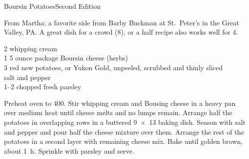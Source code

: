 \begin{entry}{Boursin Potatoes}{Second Edition}

\begin{open}
    From Martha: a favorite side from Barby Buckman at St.~Peter's in the Great
    Valley, PA. A great dish for a crowd (8), or a half recipe also works well
    for 4.
\end{open}
\begin{ingredients}
    \SI{2}{\cup} whipping cream\\
    1 \SI{5}{\ounce} ounce package Boursin cheese (herbs)\\
    \SI{3}{\pound} red new potatoes, or Yukon Gold, unpeeled, scrubbed and
    thinly sliced\\
    salt and pepper\\
    \SIrange{1}{2}{\tblspoon} chopped fresh parsley
\end{ingredients}
Preheat oven to \SI{400}{\degreeF}. Stir whipping cream and Bousing cheese in a
heavy pan over medium heat until cheese melts and no lumps remain. Arrange half
the potatoes in overlapping rows in a buttered \SI{9x13}{\inch} baking dish.
Season with salt and pepper and pour half the cheese mixture over them. Arrange
the rest of the potatoes in a second layer with remaining cheese mix. Bake until
golden brown, about \SI{1}{\hour}. Sprinkle with parsley and serve.
\end{entry}

